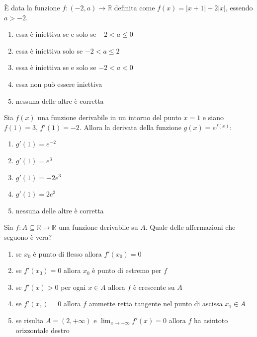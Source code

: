 \begin{quiz}
\`E data la funzione $f:(-2,a)\to\mathbb R$ definita come $f(x)=|x+1|+2|x|$, essendo $a>-2$.
\begin{enumerate}
\item essa \`e iniettiva se e solo se $-2<a\le0$
\item essa \`e iniettiva solo se $-2<a\le2$
\item essa \`e iniettiva se e solo se $-2<a<0$
\item essa non pu\`o essere iniettiva
\item nessuna delle altre \`e corretta
\end{enumerate}
\end{quiz}

\begin{quiz}
Sia $f(x)$ una funzione derivabile in un intorno del punto $x=1$ e siano $f(1)=3$, $f\prime(1)=-2$. Allora la derivata della funzione $g(x)=e^{f(x)}$:
\begin{enumerate}
\item $g\prime(1)=e^{-2}$
\item $g\prime(1)=e^3$
\item $g\prime(1)=-2e^3$
\item $g\prime(1)=2e^3$
\item nessuna delle altre \`e corretta
\end{enumerate}
\end{quiz}

\begin{quiz}
Sia $f:A\subseteq\mathbb R\to\mathbb R$ una funzione derivabile su $A$. Quale delle affermazioni che seguono \`e vera?
\begin{enumerate}
\item se $x_0$ \`e punto di flesso allora $f\prime(x_0)=0$
\item se $f\prime(x_0)=0$ allora $x_0$ \`e punto di estremo per $f$
\item se $f\prime(x)>0$ per ogni $x\in A$ allora $f$ \`e crescente su $A$
\item se $f\prime(x_1)=0$ allora $f$ ammette retta tangente nel punto di ascissa $x_1\in A$
\item se risulta $A=(2,+\infty)$ e $\lim_{x\to+\infty}f\prime(x)=0$ allora $f$ ha asintoto orizzontale destro
\end{enumerate}
\end{quiz}

